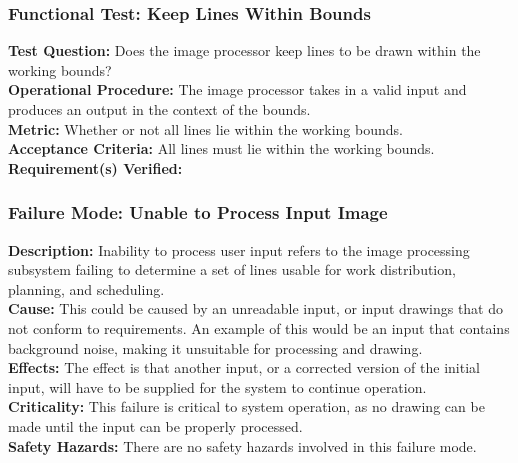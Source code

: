 \subsubsection{Functional Test: Keep Lines Within Bounds}
\label{sec:image_ft_bounds}
\textbf{Test Question:} Does the image processor keep lines to be drawn within the working bounds?\\
\textbf{Operational Procedure:} The image processor takes in a valid input and produces an output in the context of the bounds. \\
\textbf{Metric:} Whether or not all lines lie within the working bounds.\\
\textbf{Acceptance Criteria:} All lines must lie within the working bounds.\\
\textbf{Requirement(s) Verified:} 

\subsubsection{Failure Mode: Unable to Process Input Image}
\label{sec:image_fm_input}
\textbf{Description:} Inability to process user input refers to the image processing subsystem failing to determine a set of lines usable for work distribution, planning, and scheduling. \\
\textbf{Cause:} This could be caused by an unreadable input, or input drawings that do not conform to requirements. An example of this would be an input that contains background noise, making it unsuitable for processing and drawing. \\
\textbf{Effects:} The effect is that another input, or a corrected version of the initial input, will have to be supplied for the system to continue operation. \\
\textbf{Criticality:} This failure is critical to system operation, as no drawing can be made until the input can be properly processed. \\
\textbf{Safety Hazards:} There are no safety hazards involved in this failure mode.


